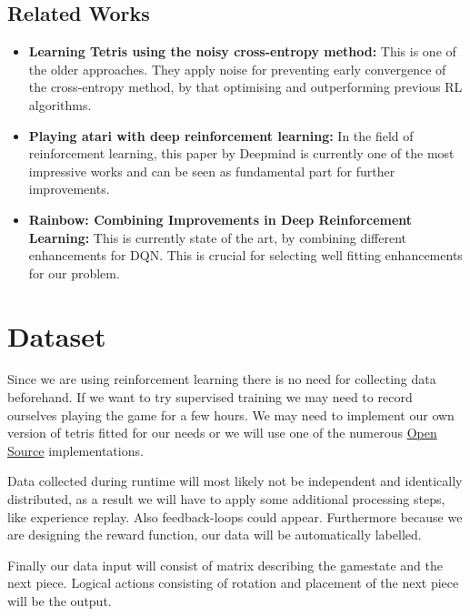 \documentclass[10pt,twocolumn,letterpaper]{article}
\begin{document}
    \subsection{Related Works}
        \begin{itemize}
            \item {\textbf{Learning Tetris using the noisy cross-entropy method:}}
            This is one of the older approaches. They apply noise for preventing early convergence of the cross-entropy method, by that optimising and outperforming previous RL algorithms. \cite{szita2006learning}
           
	 \item {\textbf{Playing atari with deep reinforcement learning:}}
            In the field of reinforcement learning, this paper by Deepmind  is currently one of the most impressive works and can be seen as fundamental part for further improvements. \cite{mnih2013playing}

            \item \textbf{{Rainbow: Combining Improvements in Deep Reinforcement Learning:}}
            This is currently state of the art, by combining different enhancements for DQN.
            This is crucial for selecting well fitting enhancements for our problem. \cite{hessel2017rainbow}
        \end{itemize}

\section{Dataset}
    	Since we are using reinforcement learning there is no need for collecting data beforehand. If we want to try supervised training we may need to record ourselves playing the game for a few hours. We may need to implement our own version of tetris fitted for our needs or we will use one of the numerous \href{https://gist.github.com/silvasur/565419}{Open Source} implementations.
        
        Data collected during runtime will most likely not be independent and identically distributed, as a result we will have to apply some additional processing steps, like experience replay. Also feedback-loops could appear. Furthermore because we are designing the reward function, our data will be automatically labelled. 
        
        Finally our data input will consist of matrix describing the gamestate and the next piece. Logical actions consisting of rotation and placement of the next piece will be the output.
\end{document}

